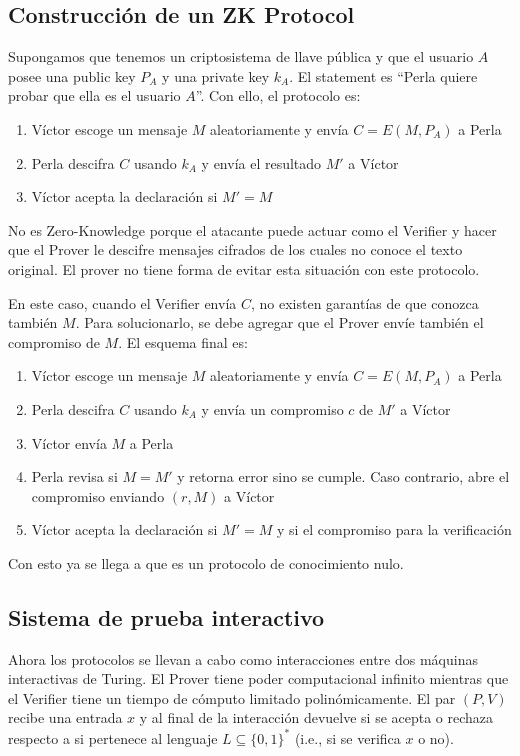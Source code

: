   \subsection{Construcción de un ZK Protocol}
  Supongamos que tenemos un criptosistema de llave pública y que el usuario $A$ posee 
  una public key $P_A$ y una private key $k_A$.
  El statement es ``Perla quiere probar que ella es el usuario $A$''.
  Con ello, el protocolo es:
  \begin{enumerate}
    \item Víctor escoge un mensaje $M$ aleatoriamente y envía $C = E(M, P_A)$ a Perla 
    \item Perla descifra $C$ usando $k_A$ y envía el resultado $M'$ a Víctor
    \item Víctor acepta la declaración si $M' = M$
  \end{enumerate}
  \begin{remark}
    No es Zero-Knowledge porque el atacante puede actuar como el Verifier 
    y hacer que el Prover le descifre mensajes cifrados de los cuales no conoce 
    el texto original.
    El prover no tiene forma de evitar esta situación con este protocolo.
  \end{remark}

  En este caso, cuando el Verifier envía $C$, no existen garantías de que conozca
  también $M$.
  Para solucionarlo, se debe agregar que el Prover envíe también el compromiso de $M$.
  El esquema final es:
  \begin{enumerate}
    \item Víctor escoge un mensaje $M$ aleatoriamente y envía $C = E(M,P_A)$ a Perla 
    \item Perla descifra $C$ usando $k_A$ y envía un compromiso $c$ de $M'$ a Víctor 
    \item Víctor envía $M$ a Perla 
    \item Perla revisa si $M = M'$ y retorna error sino se cumple.
      Caso contrario, abre el compromiso enviando $(r,M)$ a Víctor 
    \item Víctor acepta la declaración si $M' = M$ y si el compromiso para la
      verificación
  \end{enumerate}
  \begin{remark}
    Con esto ya se llega a que es un protocolo de conocimiento nulo.
  \end{remark}

  \subsection{Sistema de prueba interactivo}
  Ahora los protocolos se llevan a cabo como interacciones entre dos máquinas
  interactivas de Turing.
  El Prover tiene poder computacional infinito mientras que el Verifier tiene 
  un tiempo de cómputo limitado polinómicamente.
  El par $(P,V)$ recibe una entrada $x$ y al final de la interacción devuelve si 
  se acepta o rechaza respecto a si pertenece al lenguaje $L \subseteq \{0,1\}^*$
  (i.e., si se verifica $x$ o no).

